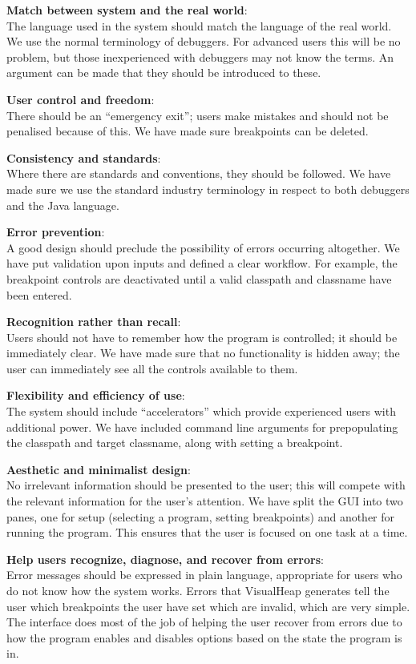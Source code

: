 \documentclass[11pt, a4paper]{report}
\begin{document}
{\bfseries Match between system and the real world}: \\
The language used in the system should match the language of the real world. We use the normal terminology of debuggers. For advanced users this will be no problem, but those inexperienced with debuggers may not know the terms. An argument can be made that they should be introduced to these.

{\bfseries User control and freedom}: \\
There should be an “emergency exit”; users make mistakes and should not be penalised because of this. We have made sure breakpoints can be deleted.

{\bfseries Consistency and standards}: \\
Where there are standards and conventions, they should be followed. We have made sure we use the standard industry terminology in respect to both debuggers and the Java language.

{\bfseries Error prevention}: \\
A good design should preclude the possibility of errors occurring altogether. We have put validation upon inputs and defined a clear workflow. For example, the breakpoint controls are deactivated until a valid classpath and classname have been entered.

{\bfseries Recognition rather than recall}: \\
Users should not have to remember how the program is controlled; it should be immediately clear. We have made sure that no functionality is hidden away; the user can immediately see all the controls available to them.

{\bfseries Flexibility and efficiency of use}: \\
The system should include “accelerators” which provide experienced users with additional power. We have included command line arguments for prepopulating the classpath and target classname, along with setting a breakpoint.

{\bfseries Aesthetic and minimalist design}: \\
No irrelevant information should be presented to the user; this will compete with the relevant information for the user’s attention. We have split the GUI into two panes, one for setup (selecting a program, setting breakpoints) and another for running the program. This ensures that the user is focused on one task at a time.

{\bfseries Help users recognize, diagnose, and recover from errors}: \\
Error messages should be expressed in plain language, appropriate for users who do not know how the system works. Errors that VisualHeap generates tell the user which breakpoints the user have set which are invalid, which are very simple. The interface does most of the job of helping the user recover from errors due to how the program enables and disables options based on the state the program is in.
\end{document}
